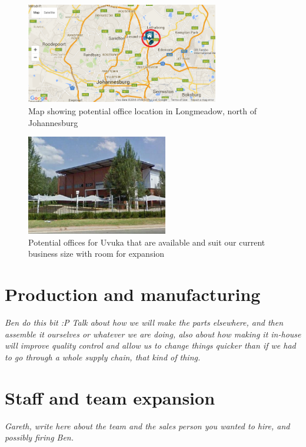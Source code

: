 \begin{figure}[H]
\centering
\includegraphics[width=0.75\textwidth]{images/offices_map.PNG}
\vskip10pt
\caption[Map showing potential office location in Longmeadow, north of Johannesburg]{Map showing potential office location in Longmeadow, north of Johannesburg}
\label{fig:map}
\end{figure}

\begin{figure}[H]
\centering
\includegraphics[width=0.55\textwidth]{images/offices_building.PNG}
\vskip10pt
\caption[Potential offices for Uvuka that are available and suit our current business size with room for expansion]{Potential offices for Uvuka that are available and suit our current business size with room for expansion}
\label{fig:offices}
\end{figure}

\section{Production and manufacturing}
\textit{Ben do this bit :P Talk about how we will make the parts elsewhere, and then assemble it ourselves or whatever we are doing, also about how making it in-house will improve quality control and allow us to change things quicker than if we had to go through a whole supply chain, that kind of thing.}

\section{Staff and team expansion}
\textit{Gareth, write here about the team and the sales person you wanted to hire, and possibly firing Ben.}

